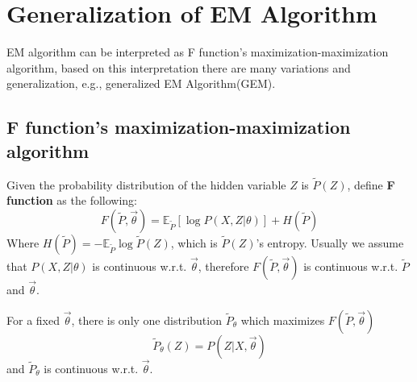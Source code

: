 \section{Generalization of EM Algorithm}
EM algorithm can be interpreted as F function's maximization-maximization algorithm, based on this interpretation there are many variations and generalization, e.g., generalized EM Algorithm(GEM).


\subsection{F function's maximization-maximization algorithm}
\begin{definition}
Given the probability distribution of the hidden variable $Z$ is $\tilde{P}(Z)$, define \textbf{F function} as the following:
\begin{equation}
F(\tilde{P},\vec{\theta})=\mathbb{E}_{\tilde{P}}\left[\log{P(X,Z|\theta)}\right]+H(\tilde{P})
\end{equation}
Where $H(\tilde{P})=-\mathbb{E}_{\tilde{P}}\log\tilde{P}(Z)$, which is $\tilde{P}(Z)$'s entropy. Usually we assume that $P(X,Z|\theta)$ is continuous w.r.t. $\vec{\theta}$, therefore $F(\tilde{P},\vec{\theta})$ is continuous w.r.t. $\tilde{P}$ and $\vec{\theta}$.
\end{definition}

\begin{lemma}
\label{lemma:F-function}
For a fixed $\vec{\theta}$, there is only one distribution $\tilde{P}_{\theta}$ which maximizes $F(\tilde{P},\vec{\theta})$
\begin{equation}
\tilde{P}_{\theta}(Z)=P(Z|X, \vec{\theta})
\end{equation}
and $\tilde{P}_{\theta}$ is continuous w.r.t. $\vec{\theta}$.
\end{lemma}

